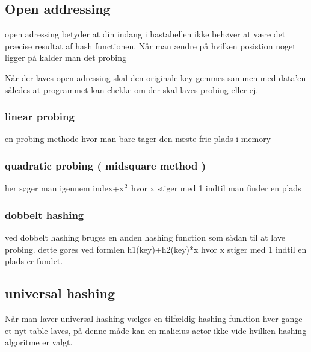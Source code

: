 \documentclass[letterpaper,10pt,danish]{sphinxmanual}
\begin{document}
\subsection{Open addressing}
\label{\detokenize{Algorithmer/Hashmaps:open-addressing}}
\sphinxAtStartPar
open adressing betyder at din indang i hastabellen ikke behøver at være det præcise resultat af hash functionen. Når man ændre på hvilken posistion noget ligger på kalder man det probing

\sphinxAtStartPar
{} Når der laves open adressing skal den originale key gemmes sammen med data’en således at programmet kan chekke om der skal laves probing eller ej.


\subsubsection{linear probing}
\label{\detokenize{Algorithmer/Hashmaps:linear-probing}}
\sphinxAtStartPar
en probing methode hvor man bare tager den næste frie plads i memory


\subsubsection{quadratic probing ( mid\sphinxhyphen{}square method )}
\label{\detokenize{Algorithmer/Hashmaps:quadratic-probing-mid-square-method}}
\sphinxAtStartPar
her søger man igennem index+x\(\sp{\text{2}}\) hvor x stiger med 1 indtil man finder en plads


\subsubsection{dobbelt hashing}
\label{\detokenize{Algorithmer/Hashmaps:dobbelt-hashing}}
\sphinxAtStartPar
ved dobbelt hashing bruges en anden hashing function som sådan til at lave probing. dette gøres ved formlen
h1(key)+h2(key)*x hvor x stiger med 1 indtil en plads er fundet.


\subsection{universal hashing}
\label{\detokenize{Algorithmer/Hashmaps:universal-hashing}}
\sphinxAtStartPar
Når man laver universal hashing vælges en tilfældig hashing funktion hver gange et nyt table laves, på denne måde kan en malicius actor ikke vide hvilken hashing algoritme er valgt.

\sphinxstepscope
\end{document}
